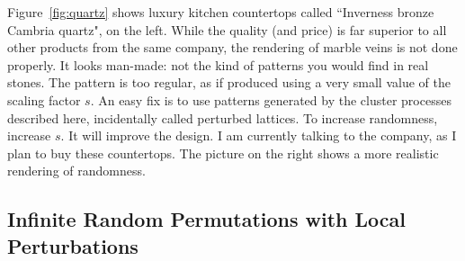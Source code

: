 \documentclass[10pt]{article}
\begin{document}
\noindent Figure~\ref{fig:quartz} shows luxury kitchen countertops called ``Inverness bronze Cambria quartz", on the left. While the quality (and price) is far superior to all 
other products from the same company, the rendering of marble veins is not done properly. It looks man-made: not the kind of patterns you would
find in real stones. The pattern is too regular, as if produced using a very small value of the scaling factor $s$. An easy fix is to use patterns generated by the cluster processes described here, incidentally called perturbed lattices. To increase randomness, increase $s$. It will improve the design. I am currently talking to the company, as I plan to buy these countertops. The picture on the right shows a more realistic rendering of randomness. 
 

\subsection{Infinite Random Permutations with Local Perturbations}\label{permut}
\end{document}
